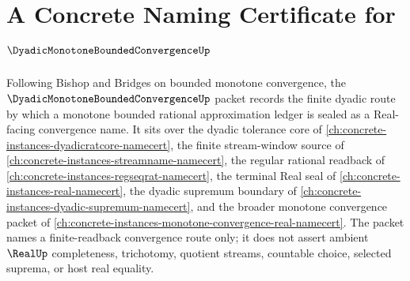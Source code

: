 \chapter{A Concrete Naming Certificate for $\DyadicMonotoneBoundedConvergenceUp$}
\label{ch:concrete-instances-dyadic-monotone-bounded-convergence-namecert}

Following Bishop and Bridges on bounded monotone convergence, the $\DyadicMonotoneBoundedConvergenceUp$ packet records the finite dyadic route by which a monotone bounded rational approximation ledger is sealed as a Real-facing convergence name. It sits over the dyadic tolerance core of \autoref{ch:concrete-instances-dyadicratcore-namecert}, the finite stream-window source of \autoref{ch:concrete-instances-streamname-namecert}, the regular rational readback of \autoref{ch:concrete-instances-regseqrat-namecert}, the terminal Real seal of \autoref{ch:concrete-instances-real-namecert}, the dyadic supremum boundary of \autoref{ch:concrete-instances-dyadic-supremum-namecert}, and the broader monotone convergence packet of \autoref{ch:concrete-instances-monotone-convergence-real-namecert}. The packet names a finite-readback convergence route only; it does not assert ambient $\RealUp$ completeness, trichotomy, quotient streams, countable choice, selected suprema, or host real equality.

